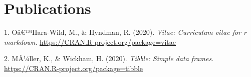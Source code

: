 \documentclass[11pt, a4paper]{awesome-cv}
\begin{document}
\hypertarget{publications}{%
\section{Publications}\label{publications}}

\hypertarget{bibliography}{}
\leavevmode\hypertarget{ref-R-vitae}{}%
1. Oâ€™Hara-Wild, M., \& Hyndman, R. (2020). \emph{Vitae: Curriculum
vitae for r markdown}. \url{https://CRAN.R-project.org/package=vitae}

\leavevmode\hypertarget{ref-R-tibble}{}%
2. MÃ¼ller, K., \& Wickham, H. (2020). \emph{Tibble: Simple data
frames}. \url{https://CRAN.R-project.org/package=tibble}
\end{document}
